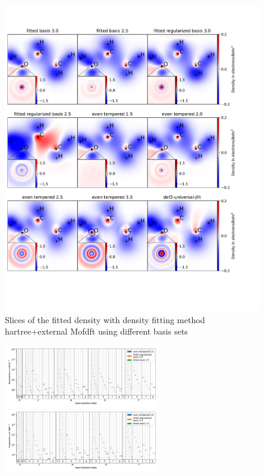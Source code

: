  \begin{figure}
   \centering
   \includegraphics[width=1\textwidth]{chapters/results/results_images/basis_set_slices.pdf}
     \caption{Slices of the fitted density with density fitting method hartree+external Mofdft using different basis sets}
 \end{figure}



\begin{figure}
   \centering
   \includegraphics[width=0.6\textwidth]{chapters/results/results_images/basis_functions_with_size2.5}
   \includegraphics[width=0.6\textwidth]{chapters/results/results_images/basis_functions_with_size3.0}
    \caption{}
\end{figure}









